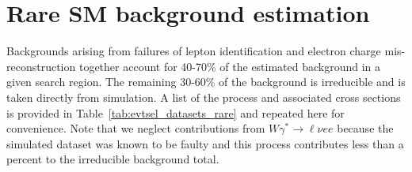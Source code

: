 \section{Rare SM background estimation}
\label {sec:bkgd_rare}
Backgrounds arising from failures of lepton identification and electron charge
mis-reconstruction together account for 40-70\% of the estimated background in
a given search region. The remaining 30-60\% of the background is irreducible
and is taken directly from simulation. A list of the process and associated
cross sections is provided in Table~\ref{tab:evtsel_datasets_rare} and repeated
here for convenience. Note that we neglect contributions from $W\gamma^{*}
\rightarrow \ell \nu ee$ because the simulated dataset was known to be faulty
and this process contributes less than a percent to the irreducible background
total.

